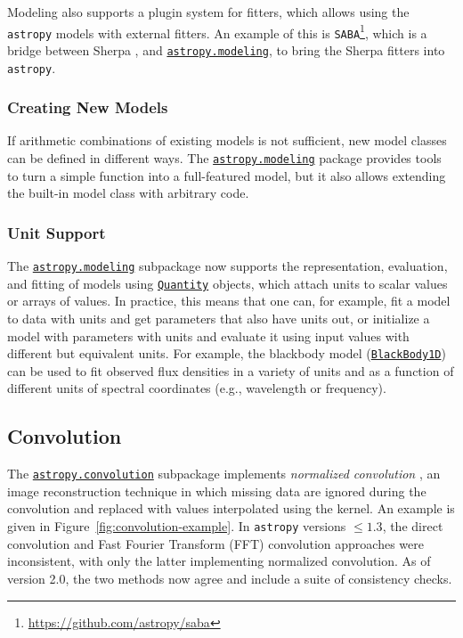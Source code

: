 \documentclass[modern]{aastex62}
\newcommand{\package}[1]{\texttt{#1}\xspace}
\newcommand{\astropypkg}{\package{astropy}}
\renewcommand{\figurename}{Figure\xspace}
\newcommand{\astropysubpkg}[1]{\href{http://docs.astropy.org/en/stable/#1/index.html}{\texttt{astropy.#1}}\xspace}
\newcommand{\astropyQuantity}{\href{http://docs.astropy.org/en/stable/api/astropy.units.Quantity.html}{\texttt{Quantity}}\xspace}
\begin{document}
Modeling also supports a plugin system for fitters, which allows using the
\astropypkg models with external fitters. An example of this is
\package{SABA}\footnote{\url{https://github.com/astropy/saba}}, which is a bridge between
Sherpa \citep{sherpa},
and \astropysubpkg{modeling}, to bring the Sherpa fitters into \astropypkg.

\subsubsection{Creating New Models}
If arithmetic combinations of existing models is not sufficient, new model
classes can be defined in different ways. The \astropysubpkg{modeling}
package provides tools to turn a simple function into a full-featured model,
but it also allows extending the built-in model class with arbitrary code.

\subsubsection{Unit Support}

The \astropysubpkg{modeling} subpackage now supports the representation,
evaluation, and fitting of models using \astropyQuantity objects, which attach
units to scalar values or arrays of values. In practice, this means that one
can, for example, fit a model to data with units and get parameters that also
have units out, or initialize a model with parameters with units and evaluate
it using input values with different but equivalent units. For example, the
blackbody model
(\href{http://docs.astropy.org/en/stable/api/astropy.modeling.blackbody.BlackBody1D.html}{\texttt{BlackBody1D}})
can be used to fit observed flux densities in a variety of units and as a
function of different units of spectral coordinates (e.g., wavelength or
frequency).

\subsection{Convolution}
\label{ssec:convolution}

The \astropysubpkg{convolution} subpackage implements
\textit{normalized convolution} \citep[e.g.,][]{Knutsson1993}, an image
reconstruction technique in which missing data are ignored during the
convolution and replaced with values interpolated using the kernel.
An example is given in \figurename~\ref{fig:convolution-example}.
In \astropypkg versions $\leq 1.3$, the direct convolution and Fast Fourier Transform (FFT)
convolution approaches were inconsistent, with only the latter implementing
normalized convolution.
As of version 2.0, the two methods now agree and include a suite of
consistency checks.
\end{document}
